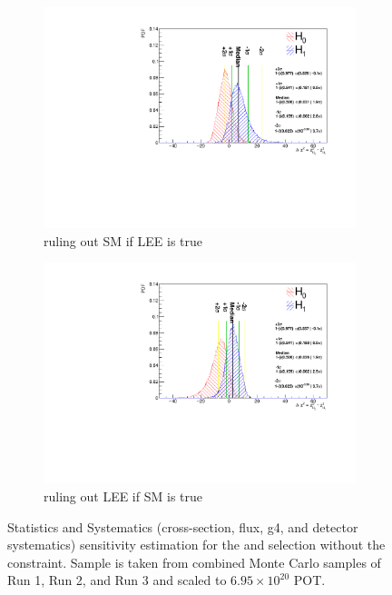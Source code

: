 \begin{figure}[H]
    \centering
    \begin{subfigure}[b]{0.48\textwidth}
    \centering
    \includegraphics[width=1.00\textwidth]{Sensitivity/sensitivity-run123/SBNfit_Cls_nue_1e0p_reco_e_H1_mc_collab_syst_detsysCNP_Chi.pdf}
    \caption{ruling out SM if LEE is true}
    \end{subfigure}
    \begin{subfigure}[b]{0.48\textwidth}
    \centering
    \includegraphics[width=1.00\textwidth]{Sensitivity/sensitivity-run123/SBNfit_Cls_nue_1e0p_reco_e_H1_mc_collab_syst_detsys_exclusionCNP_Chi.pdf}
    \caption{ruling out LEE if SM is true}
    \end{subfigure}
    \caption{Statistics and Systematics (cross-section, flux, g4, and detector systematics) sensitivity estimation for the \npsel and \zpsel selection without the \numu constraint. Sample is taken from combined Monte Carlo samples of Run 1, Run 2, and Run 3 and scaled to $6.95\times10^20$ POT.}
    \label{fig:1eNp:BDT:statsystsensitivity}
\end{figure}

